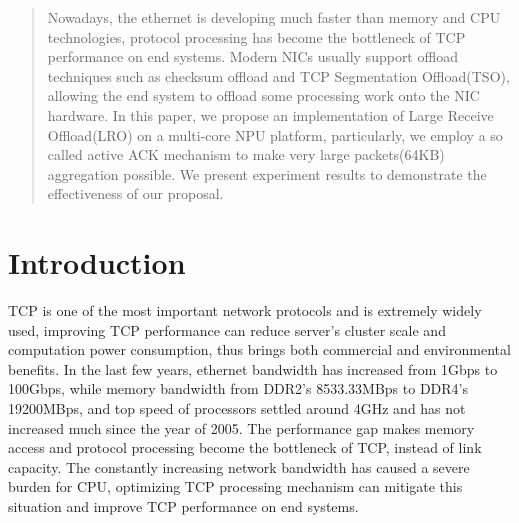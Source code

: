 \documentclass[conference]{IEEEtran}
\begin{document}




\maketitle

\begin{abstract}
Nowadays, the ethernet is developing much faster than memory and CPU technologies, protocol processing has become the bottleneck of TCP performance on end systems. Modern NICs usually support offload techniques such as checksum offload and TCP Segmentation Offload(TSO), allowing the end system to offload some processing work onto the NIC hardware. In this paper, we propose an implementation of Large Receive Offload(LRO) on a multi-core NPU platform, particularly, we employ a so called active ACK mechanism to make very large packets(64KB) aggregation possible. We present experiment results to demonstrate the effectiveness of our proposal.
\end{abstract}





%
\IEEEpeerreviewmaketitle



\section{Introduction}


TCP is one of the most important network protocols and is extremely widely used, improving TCP performance can reduce server's cluster scale and computation power consumption, thus brings both commercial and environmental benefits. In the last few years, ethernet bandwidth has increased from 1Gbps to 100Gbps, while memory bandwidth from DDR2's 8533.33MBps\cite{wikiddr2} to DDR4's 19200MBps\cite{wikiddr4}, and top speed of processors settled around 4GHz and has not increased much since the year of 2005\cite{danowitz2012cpu}. The performance gap makes memory access and protocol processing become the bottleneck of TCP, instead of link capacity. The constantly increasing network bandwidth has caused a severe burden for CPU, optimizing TCP processing mechanism can mitigate this situation and improve TCP performance on end systems.
\end{document}
